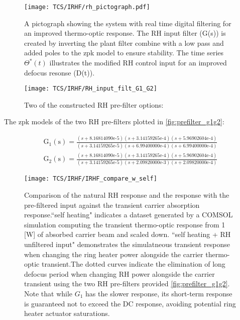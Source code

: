 \begin{figure}[H]
    \centering
    \texttt{[image: TCS/IRHF/rh\_pictograph.pdf]}
    \caption{A pictograph showing the system with real time digital filtering for an improved thermo-optic response. The RH input filter (G(s)) is created by inverting the plant filter combine with a low pass and added poles to the zpk model to ensure stability. The time series $\Theta^*(t)$ illustrates the modified RH control input for an improved defocus resonse (D(t)).}
    \label{fig:rtdf_pictograph}
\end{figure}

\begin{figure}[H]
    \centering
    \texttt{[image: TCS/IRHF/RH\_input\_filt\_G1\_G2]}
    \caption{Two of the constructed RH pre-filter options: 
	}
    \label{fig:prefilter_g1g2}
\end{figure}

The zpk models of the two RH pre-filters plotted in \autoref{fig:prefilter_g1g2}:

\begin{equation}
   \begin{aligned}
       \mathrm{G}_1(\mathrm{s}) = \frac{(s+8.16814090\mathrm{e}\text{-}5) (s+3.14159265\mathrm{e}\text{-}4) (s+5.96902604\mathrm{e}\text{-}4)}{(s+3.14159265\mathrm{e}\text{-}5)(s+6.99400000\mathrm{e}\text{-}4)(s+6.99400000\mathrm{e}\text{-}4)} \\
       \mathrm{G}_2(\mathrm{s}) = \frac{(s+8.16814090\mathrm{e}\text{-}5) (s+3.14159265\mathrm{e}\text{-}4) (s+5.96902604\mathrm{e}\text{-}4)}{(s+3.14159265\mathrm{e}\text{-}5)(s+2.09820000\mathrm{e}\text{-}3)(s+2.09820000\mathrm{e}\text{-}4)}
    \end{aligned}
\end{equation}

\begin{figure}[H]
    \centering
    \texttt{[image: TCS/IRHF/IRHF\_compare\_w\_self]}
    \caption{Comparison of the natural RH response and the response with the pre-filtered input against the transient carrier absorption response.``self heating" indicates a dataset generated by a COMSOL simulation computing the transient thermo-optic response from 1 [W] of absorbed carrier beam and scaled down. ``self heating + RH unfiltered input" demonstrates the simulatneous transient response when changing the ring heater power alongside the carrier thermo-optic transient.The dotted curves indicate the elimination of long defocus period when changing RH power alongside the carrier transient using the two RH pre-filters provided \autoref{fig:prefilter_g1g2}. Note that while $G_1$ has the slower response, its short-term response is guaranteed not to exceed the DC response, avoiding potential ring heater actuator saturations.
    \iffalse \swb{Note that while $G_1$ has the slower response, its short-term response is guaranteed not to exceed the DC response, avoiding potential ring heater actuator saturations.} \fi }
    \label{fig:dynam_comparison}
\end{figure}

